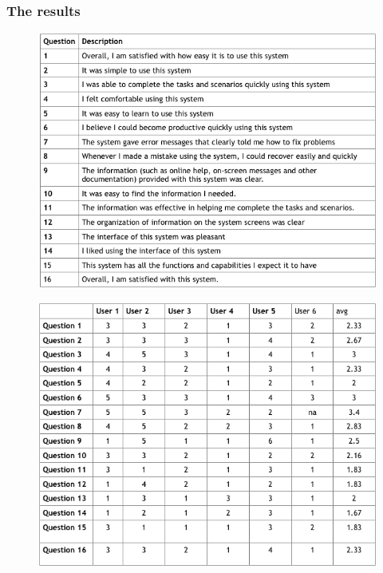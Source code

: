 \documentclass[12pt]{article}
\begin{document}
{\subsubsection{The results}
\begin{center}
	\begin{figure}[h]
		\includegraphics[width=\textwidth]{tests/usab/questions.png}
	\end{figure}
	\begin{figure}[h]
		\includegraphics[width=\textwidth]{tests/usab/results.png}
	\end{figure}
	\begin{figure}[h]

\end{figure}
\end{center}}
\end{document}
